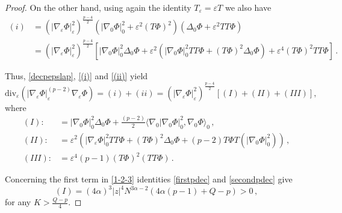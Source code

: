\documentclass[10pt,a4paper]{amsart}
\newcommand{\egrad}{\nabla_{\eps}}
\newcommand{\eps}{\varepsilon}
\newcommand{\hLap}{\Delta_{\mathnormal{H}}}
\newcommand{\hgrad}{\nabla_{\mathnormal{H}}}
\newcommand{\hnorm}[1]{\|{#1}\|_{\mathnormal{H}}}
\newcommand{\scal}[2]{\langle {#1},{#2}\rangle}
\begin{document}
\begin{proof}
On the other hand, using again the identity $T_\varepsilon= \varepsilon T$ we also have 
\begin{equation}
\label{(i)}
\begin{aligned}
(i) &= \left(|\egrad \Phi|_\varepsilon^2 \right)^{\tfrac{p-4}{2}} \left( |\nabla_0 \Phi|_0^{2} + \eps^2 (T\Phi)^2 \right) (\Delta_0 \Phi + \eps^2 TT\Phi)\\
&= \left(|\egrad \Phi|_\varepsilon^2 \right)^{\tfrac{p-4}{2}} \left[ |\nabla_0 \Phi|_0^{2}\Delta_0 \Phi+ \varepsilon^2 \left( |\nabla_0 \Phi|_0^{2}TT\Phi+ (T\Phi)^2 \Delta_0 \Phi\right) +\varepsilon^4 (T\Phi)^2TT\Phi \right]\,.
\end{aligned}
\end{equation}

Thus, \eqref{decpepslap}, \eqref{(i)} and \eqref{(ii)} yield 
\begin{equation}
\label{decpepslap2}
\mathrm{div}_{\eps} \left( |\nabla_{\eps} \Phi|_{\eps}^{(p-2)}\nabla_{\eps}\Phi \right) =(i)+(ii)= \left(|\nabla_{\eps}\Phi|_{\eps}^2 \right)^{\tfrac{p-4}{2}}\left[ (I) + (II) + (III)  \right],
\end{equation}
\noindent where
\begin{equation}
\label{1-2-3}
\begin{aligned}
(I):&= |\nabla_0 \Phi|_0^{2}\Delta_0 \Phi+\frac{(p-2)}2   \scal{\nabla_0 |\nabla_0 \Phi|^2_0}{\nabla_0 \Phi}_0 \, ,\\
(II):&= \varepsilon^2 \left( |\nabla_\varepsilon \Phi|_0^{2}TT\Phi+ (T\Phi)^2 \Delta_0 \Phi    +(p-2)T\Phi T \left( |\nabla_0 \Phi|^2_0\right) \right) \, , \\
(III):&= \eps^4 (p-1)  (T\Phi)^2 (TT\Phi) \, .
\end{aligned}
\end{equation}

\noindent Concerning the first term in \eqref{1-2-3} identities \eqref{firstpdec} and \eqref{secondpdec} give
\begin{equation}
\label{ineq(1)}
(I)= (4\alpha)^3 |z|^4 N^{3\alpha-2} (4\alpha (p-1)+Q-p)
>0 \, ,
\end{equation}
\noindent for any $K>\frac{Q-p}4$.


\end{proof}
\end{document}
